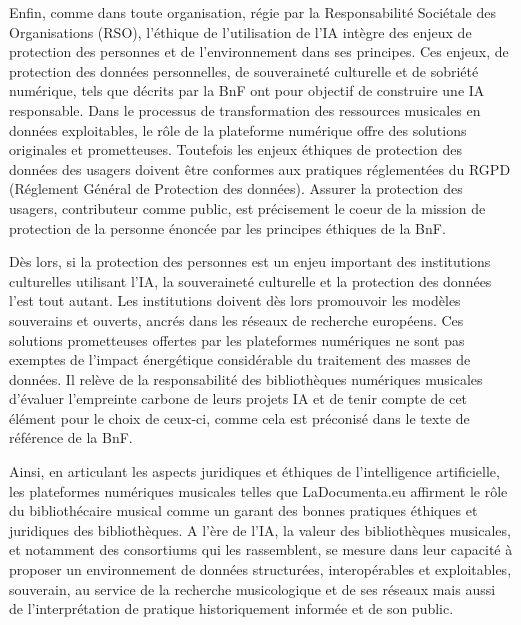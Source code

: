 Enfin, comme dans toute organisation, régie par la Responsabilité Sociétale des Organisations (RSO), l’éthique de l’utilisation de l’IA intègre des enjeux de protection des personnes et de l’environnement dans ses principes. Ces enjeux, de protection des données personnelles, de souveraineté culturelle et de sobriété numérique, tels que décrits par la BnF ont pour objectif de construire une IA responsable.
Dans le processus de transformation des ressources musicales en données exploitables, le rôle de la plateforme numérique offre des solutions originales et prometteuses. Toutefois les enjeux éthiques de protection des données des usagers doivent être conformes aux pratiques réglementées du RGPD (Réglement Général de Protection des données). Assurer la protection des usagers, contributeur comme public, est précisement le coeur de la mission de protection de la personne énoncée par les principes éthiques de la BnF.



Dès lors, si la protection des personnes est un enjeu important des institutions culturelles utilisant l’IA, la souveraineté culturelle et la protection des données l’est tout autant. Les institutions doivent dès lors promouvoir les modèles souverains et ouverts, ancrés dans les réseaux de recherche européens. Ces solutions prometteuses offertes par les plateformes numériques ne sont pas exemptes de l’impact énergétique considérable du traitement des masses de données. Il relève de la responsabilité des bibliothèques numériques musicales d’évaluer l’empreinte carbone de leurs projets IA et de tenir compte de cet élément pour le choix de ceux-ci, comme cela est préconisé dans le texte de référence de la BnF.



Ainsi, en articulant les aspects juridiques et éthiques de l’intelligence artificielle, les plateformes numériques musicales telles que LaDocumenta.eu affirment le rôle du bibliothécaire musical comme un garant des bonnes pratiques éthiques et juridiques des bibliothèques. A l’ère de l’IA, la valeur des bibliothèques musicales, et notamment des consortiums qui les rassemblent, se mesure dans leur capacité à proposer un environnement de données structurées, interopérables et exploitables, souverain, au service de la recherche musicologique et de ses réseaux mais aussi de l’interprétation de pratique historiquement informée et de son public.
